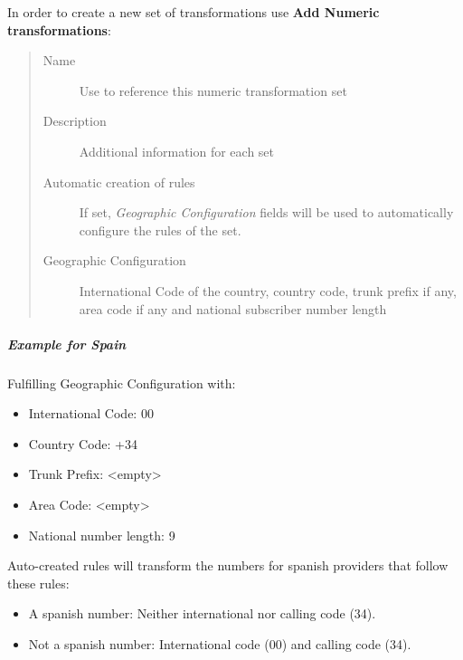 \documentclass[letterpaper,10pt,spanish]{sphinxmanual}
\begin{document}
In order to create a new set of transformations use \textbf{Add Numeric transformations}:
\begin{quote}
\begin{description}
\item[{Name}] \leavevmode
Use to reference this numeric transformation set

\item[{Description}] \leavevmode
Additional information for each set

\item[{Automatic creation of rules}] \leavevmode
If set, \emph{Geographic Configuration} fields will be used to automatically configure the rules of the set.

\item[{Geographic Configuration}] \leavevmode
International Code of the country, country code, trunk prefix if any, area code if any and national subscriber
number length

\end{description}
\end{quote}


\subparagraph{Example for Spain}
\label{administration_portal/brand/settings/numeric_transformations:example-for-spain}
Fulfilling Geographic Configuration with:
\begin{itemize}
\item {} 
International Code: 00

\item {} 
Country Code: +34

\item {} 
Trunk Prefix: \textless{}empty\textgreater{}

\item {} 
Area Code: \textless{}empty\textgreater{}

\item {} 
National number length: 9

\end{itemize}

Auto-created rules will transform the numbers for spanish providers that follow these rules:
\begin{itemize}
\item {} 
A spanish number: Neither international nor calling code (34).

\item {} 
Not a spanish number: International code (00) and calling code (34).

\end{itemize}
\end{document}
